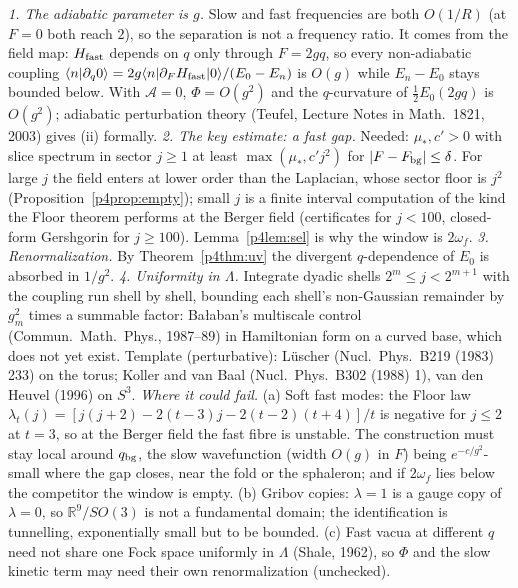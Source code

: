 \begin{sketch}
\emph{1. The adiabatic parameter is $g$.} Slow and fast frequencies are both $O(1/R)$ (at $F=0$ both reach $2$), so the
separation is not a frequency ratio. It comes from the field map: $H_{\rm fast}$ depends on $q$ only through $F=2gq$, so every non-adiabatic coupling
$\langle n|\partial_q0\rangle=2g\langle n|\partial_FH_{\rm fast}|0\rangle/(E_0-E_n)$ is $O(g)$ while $E_n-E_0$ stays bounded
below. With $\mathcal{A}=0$, $\Phi=O(g^2)$ and the $q$-curvature of $\tfrac12E_0(2gq)$ is $O(g^2)$; adiabatic perturbation theory
(Teufel, Lecture Notes in Math.\ 1821, 2003) gives (ii) formally.
\emph{2. The key estimate: a fast gap.} Needed: $\mu_*,c'>0$ with slice spectrum in sector $j\geq1$ at least $\max(\mu_*,c'j^2)$
for $|F-F_{\rm bg}|\leq\delta$. For large $j$ the field enters at lower order than the Laplacian, whose sector floor is $j^2$
(Proposition~\ref{p4prop:empty}); small $j$ is a finite interval computation of the kind the Floor theorem performs at the
Berger field (certificates for $j<100$, closed-form Gershgorin for $j\geq100$). Lemma~\ref{p4lem:sel} is why the window is $2\omega_f$.
\emph{3. Renormalization.} By Theorem~\ref{p4thm:uv} the divergent $q$-dependence of $E_0$ is absorbed in $1/g^2$.
\emph{4. Uniformity in $\Lambda$.} Integrate dyadic shells $2^m\leq j<2^{m+1}$ with the coupling run shell by shell, bounding
each shell's non-Gaussian remainder by $g_m^2$ times a summable factor: Ba{\l}aban's multiscale control (Commun.\ Math.\ Phys.,
1987--89) in Hamiltonian form on a curved base, which does not yet exist. Template (perturbative): L\"uscher (Nucl.\ Phys.\
B219 (1983) 233) on the torus; Koller and van Baal (Nucl.\ Phys.\ B302 (1988) 1), van den Heuvel (1996) on $S^3$.
\emph{Where it could fail.} (a) Soft fast modes: the Floor law $\lambda_t(j)=[j(j+2)-2(t-3)j-2(t-2)(t+4)]/t$ is negative for
$j\leq2$ at $t=3$, so at the Berger field the fast fibre is unstable. The construction must stay local around $q_{\rm bg}$, the
slow wavefunction (width $O(g)$ in $F$) being $e^{-c/g^2}$-small where the gap closes, near the fold or the sphaleron; and if
$2\omega_f$ lies below the competitor the window is empty. (b) Gribov copies: $\lambda=1$ is a gauge copy of $\lambda=0$, so
$\mathbb{R}^9/SO(3)$ is not a fundamental domain; the identification is tunnelling, exponentially small but to be bounded.
(c) Fast vacua at different $q$ need not share one Fock space uniformly in $\Lambda$ (Shale, 1962), so $\Phi$ and the slow
kinetic term may need their own renormalization (unchecked).
\end{sketch}
